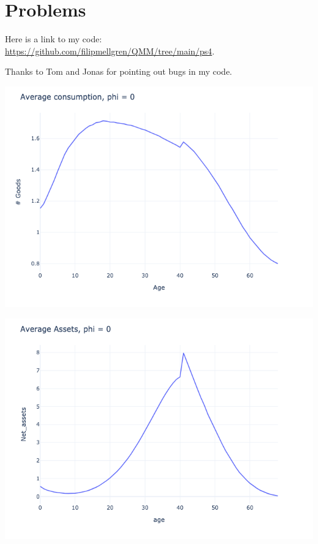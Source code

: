 \section{Problems}

Here is a link to my code: \url{https://github.com/filipmellgren/QMM/tree/main/ps4}.

Thanks to Tom and Jonas for pointing out bugs in my code.

\begin{questions}
\begin{solution}

\includegraphics[scale=0.5]{figures/consumption_0_tax_15.png}

\includegraphics[scale=0.5]{figures/avg_assets_0_tax_15.png}


\end{solution}
\end{questions}
